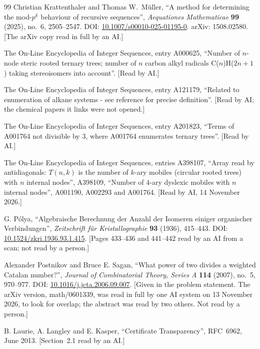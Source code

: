 \documentclass[11pt]{article}
\theoremstyle{definition}
\theoremstyle{remark}
\numberwithin{equation}{section}
\numberwithin{figure}{section}
\begin{document}
\begin{thebibliography}{99}
Christian Krattenthaler and Thomas W.\ M\"uller, ``A method for determining the mod-$p^k$ behaviour of
recursive sequences'', \emph{Aequationes Mathematicae} \textbf{99} (2025), no.~6, 2505--2547. DOI:
\href{https://doi.org/10.1007/s00010-025-01195-0}{10.1007/s00010-025-01195-0}. arXiv: 1508.02580. [The arXiv
copy read in full by an AI.]

The On-Line Encyclopedia of Integer Sequences, entry A000625, ``Number of $n$-node steric rooted ternary
trees; number of $n$ carbon alkyl radicals C($n$)H($2n+1$) taking stereoisomers into account''. [Read by AI.]

The On-Line Encyclopedia of Integer Sequences, entry A121179, ``Related to enumeration of alkane systems - see
reference for precise definition''. [Read by AI; the chemical papers it links were not opened.]

The On-Line Encyclopedia of Integer Sequences, entry A201823, ``Terms of A001764 not divisible by 3, where
A001764 enumerates ternary trees''. [Read by AI.]

The On-Line Encyclopedia of Integer Sequences, entries A398107, ``Array read by antidiagonals: $T(n,k)$ is
the number of $k$-ary mobiles (circular rooted trees) with $n$ internal nodes'', A398109, ``Number of $4$-ary
dyslexic mobiles with $n$ internal nodes'', A001190, A002293 and A001764. [Read by AI, 14 November 2026.]

G. P\'olya, ``Algebraische Berechnung der Anzahl der Isomeren einiger organischer Verbindungen'',
\emph{Zeitschrift f\"ur Kristallographie} \textbf{93} (1936), 415--443. DOI:
\href{https://doi.org/10.1524/zkri.1936.93.1.415}{10.1524/zkri.1936.93.1.415}. [Pages 433--436 and 441--442
read by an AI from a scan; not read by a person.]

Alexander Postnikov and Bruce E. Sagan, ``What power of two divides a weighted Catalan number?'',
\emph{Journal of Combinatorial Theory, Series A} \textbf{114} (2007), no.~5, 970--977. DOI:
\href{https://doi.org/10.1016/j.jcta.2006.09.007}{10.1016/j.jcta.2006.09.007}. [Given in the problem
statement. The arXiv version, math/0601339, was read in full by one AI system on 13 November 2026, to look
for overlap; the abstract was read by two others. Not read by a person.]

B. Laurie, A. Langley and E. Kasper, ``Certificate Transparency'', RFC~6962, June 2013. [Section~2.1 read by
an AI.]


\end{thebibliography}
\end{document}
